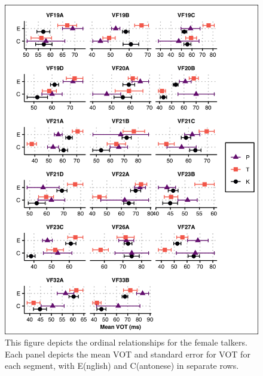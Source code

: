 \begin{figure}[htbp]
  \begin{center}
  \includegraphics[width=0.9\linewidth]{figures/ch4_ordrel_vf_5in.png} 
  \caption{This figure depicts the ordinal relationships for the female talkers. Each panel depicts the mean VOT and standard error for VOT for each segment, with E(nglish) and C(antonese) in separate rows.}
  \label{ch4:fig:ordrelvf}
  \end{center}
\end{figure}

